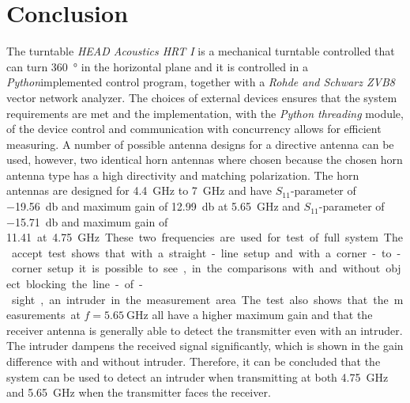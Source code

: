 \chapter{Conclusion}
The turntable \textit{HEAD Acoustics HRT I} is a mechanical turntable controlled that can turn \SI{360}{\degree} in the horizontal plane and it is controlled in a \textit{Python}implemented control program, together with a \textit{Rohde and Schwarz ZVB8} vector network analyzer. The choices of external devices ensures that the system requirements are met and the implementation, with the \textit{Python threading} module, of the device control and communication with concurrency allows for efficient measuring. A number of possible antenna designs for a directive antenna can be used, however, two identical horn antennas where chosen because the chosen horn antenna type has a high directivity and matching polarization. The horn antennas are designed for \SI{4.4}{\giga\hertz} to \SI{7}{\giga\hertz} and have $S_{11}$-parameter of \SI{-19.56}{\decibel} and maximum gain of \SI{12.99}{\decibel} at \SI{5.65}{\giga\hertz} and $S_{11}$-parameter of \SI{-15.71}{\decibel} and maximum gain of \SI{11.41} at \SI{4.75}{\giga\hertz}. These two frequencies are used for test of full system. The accept test shows that with a straight-line setup and with a corner-to-corner setup it is possible to see, in the comparisons with and without object blocking the line-of-sight, an intruder in the measurement area. The test also shows that the measurements at $f=\SI{5.65}{\giga\hertz}$ all have a higher maximum gain and that the receiver antenna is generally able to detect the transmitter even with an intruder. The intruder dampens the received signal significantly, which is shown in the gain difference with and without intruder. Therefore, it can be concluded that the system can be used to detect an intruder when transmitting at both \SI{4.75}{\giga\hertz} and \SI{5.65}{\giga\hertz} when the transmitter faces the receiver. 